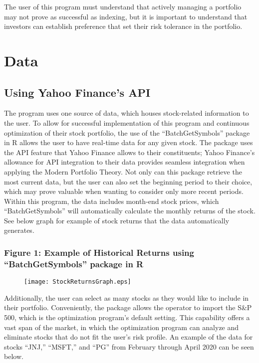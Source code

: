 \documentclass[12pt,english]{article}
\begin{document}
\begin{doublespace}
        \indent{}\indent{} 
        The user of this program must understand that actively managing a portfolio may not prove as successful as indexing, but it is important to understand that investors can establish preference that set their risk tolerance in the portfolio.


    \section{Data}\label{sec:data}\indent{}\indent{} %
    
        \subsection{Using Yahoo Finance's API}
        The program uses one source of data, which houses stock-related information to the user. To allow for successful implementation of this program and continuous optimization of their stock portfolio, the use of the “BatchGetSymbols” package in R allows the user to have real-time data for any given stock. The package uses the API feature that Yahoo Finance allows to their constituents; Yahoo Finance’s allowance for API integration to their data provides seamless integration when applying the Modern Portfolio Theory. Not only can this package retrieve the most current data, but the user can also set the beginning period to their choice, which may prove valuable when wanting to consider only more recent periods. Within this program, the data includes month-end stock prices, which “BatchGetSymbols” will automatically calculate the monthly returns of the stock. See below graph for example of stock returns that the data automatically generates.
        
            \subsubsection{Figure 1: Example of Historical Returns using “BatchGetSymbols” package in R}
                \begin{figure}
                    \begin{center}
                        \texttt{[image: StockReturnsGraph.eps]}
                    \end{center}
                \end{figure}
            
        Additionally, the user can select as many stocks as they would like to include in their portfolio. Conveniently, the package allows the operator to import the S&P 500, which is the optimization program’s default setting. This capability offers a vast span of the market, in which the optimization program can analyze and eliminate stocks that do not fit the user’s risk profile. An example of the data for stocks “JNJ,” “MSFT,” and “PG” from February through April 2020 can be seen below.
        

\end{doublespace}
\end{document}
